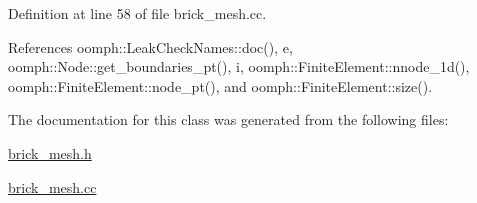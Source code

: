Definition at line 58 of file brick\+\_\+mesh.\+cc.



References oomph\+::\+Leak\+Check\+Names\+::doc(), e, oomph\+::\+Node\+::get\+\_\+boundaries\+\_\+pt(), i, oomph\+::\+Finite\+Element\+::nnode\+\_\+1d(), oomph\+::\+Finite\+Element\+::node\+\_\+pt(), and oomph\+::\+Finite\+Element\+::size().



The documentation for this class was generated from the following files\+:\begin{DoxyCompactItemize}
\item 
\hyperlink{brick__mesh_8h}{brick\+\_\+mesh.\+h}\item 
\hyperlink{brick__mesh_8cc}{brick\+\_\+mesh.\+cc}\end{DoxyCompactItemize}

